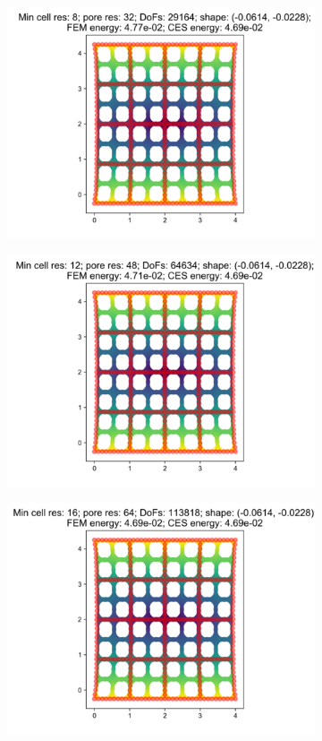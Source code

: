 \begin{figure}[H]
\begin{subfigure}{.45\textwidth}
\end{subfigure}
\begin{subfigure}{.45\textwidth}
  \centering
  \includegraphics[width=.8\linewidth]{lces/vis_tension/bm_6_mesh_3.png}
\end{subfigure}
\newline
\begin{subfigure}{.45\textwidth}
  \centering
  \includegraphics[width=.8\linewidth]{lces/vis_tension/bm_6_mesh_4.png}
\end{subfigure}
\begin{subfigure}{.45\textwidth}
  \centering
  \includegraphics[width=.8\linewidth]{lces/vis_tension/bm_6_mesh_5.png}
\end{subfigure}
\end{figure}
